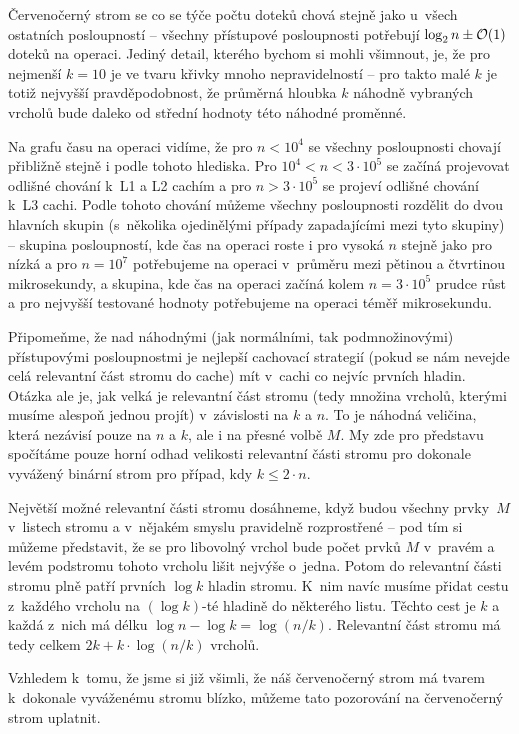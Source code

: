 Červenočerný strom se co se týče počtu doteků chová stejně jako u~všech
ostatních posloupností -- všechny přístupové posloupnosti potřebují $\log n \pm
\o(1)$ doteků na operaci. Jediný detail, kterého bychom si mohli všimnout, je,
že pro nejmenší $k=10$ je ve tvaru křivky mnoho nepravidelností -- pro takto
malé $k$ je totiž nejvyšší pravděpodobnost, že průměrná hloubka $k$ náhodně
vybraných vrcholů bude daleko od střední hodnoty této náhodné proměnné. 

Na grafu času na operaci vidíme, že pro $n<10^4$ se všechny posloupnosti
chovají přibližně stejně i podle tohoto hlediska. Pro $10^4 < n < 3\cdot
10^5$ se začíná projevovat odlišné chování k~L1 a L2 cachím a pro $n > 3\cdot
10^5$ se projeví odlišné chování k~L3 cachi. Podle tohoto chování můžeme
všechny posloupnosti rozdělit do dvou hlavních skupin (s~několika ojedinělými
případy zapadajícími mezi tyto skupiny) -- skupina posloupností, kde čas
na operaci roste i pro vysoká $n$ stejně jako pro nízká a pro $n=10^7$
potřebujeme na operaci v~průměru mezi pětinou a čtvrtinou mikrosekundy, a
skupina, kde čas na operaci začíná kolem $n=3\cdot 10^5$ prudce růst a pro
nejvyšší testované hodnoty potřebujeme na  
operaci téměř mikrosekundu.

Připomeňme, že nad náhodnými (jak normálními, tak podmnožinovými) přístupovými
posloupnostmi je nejlepší cachovací strategií (pokud se nám nevejde celá
relevantní část stromu do cache) mít v~cachi co nejvíc prvních hladin. Otázka
ale je, jak velká je relevantní část stromu (tedy množina vrcholů, kterými
musíme alespoň jednou projít) v~závislosti na $k$ a $n$. To je náhodná veličina,
která nezávisí pouze na $n$ a $k$, ale i na přesné volbě $M$. My zde pro
představu spočítáme pouze horní odhad velikosti relevantní části stromu pro
dokonale vyvážený binární strom pro případ, kdy $k\leq2\cdot n$. 

Největší možné relevantní části stromu dosáhneme, když budou všechny prv\-ky~$M$ v~listech stromu a v~nějakém smyslu pravidelně rozprostřené -- pod tím si můžeme představit, že se pro libovolný vrchol bude počet prvků $M$ v~pravém a levém podstromu tohoto vrcholu lišit nejvýše o~jedna. Potom do relevantní části stromu plně patří prvních $\log k$ hladin stromu. K~nim navíc musíme přidat cestu z~každého vrcholu na $(\log k)$-té hladině do některého listu. Těchto cest je $k$ a každá z~nich má délku $\log n - \log k = \log (n/k)$. Relevantní část stromu  má tedy celkem $2k + k\cdot \log (n/k)$ vrcholů.

Vzhledem k~tomu, že jsme si již všimli, že náš červenočerný strom má tvarem k~dokonale vyváženému stromu blízko, můžeme tato pozorování na červenočerný strom uplatnit.

